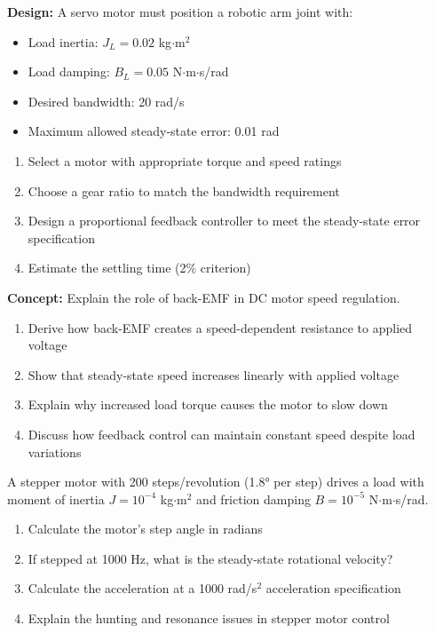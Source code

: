 \begin{exercise}
\textbf{Design:} A servo motor must position a robotic arm joint with:
\begin{itemize}
    \item Load inertia: $J_L = 0.02$ kg$\cdot$m$^2$
    \item Load damping: $B_L = 0.05$ N$\cdot$m$\cdot$s/rad
    \item Desired bandwidth: 20 rad/s
    \item Maximum allowed steady-state error: 0.01 rad
\end{itemize}

\begin{enumerate}[label=(\alph*)]
    \item Select a motor with appropriate torque and speed ratings
    \item Choose a gear ratio to match the bandwidth requirement
    \item Design a proportional feedback controller to meet the steady-state error specification
    \item Estimate the settling time (2\% criterion)
\end{enumerate}
\end{exercise}

\begin{exercise}
\textbf{Concept:} Explain the role of back-EMF in DC motor speed regulation.

\begin{enumerate}[label=(\alph*)]
    \item Derive how back-EMF creates a speed-dependent resistance to applied voltage
    \item Show that steady-state speed increases linearly with applied voltage
    \item Explain why increased load torque causes the motor to slow down
    \item Discuss how feedback control can maintain constant speed despite load variations
\end{enumerate}
\end{exercise}

\begin{exercise}
A stepper motor with 200 steps/revolution (1.8° per step) drives a load with moment of inertia $J = 10^{-4}$ kg$\cdot$m$^2$ and friction damping $B = 10^{-5}$ N$\cdot$m$\cdot$s/rad.

\begin{enumerate}[label=(\alph*)]
    \item Calculate the motor's step angle in radians
    \item If stepped at 1000 Hz, what is the steady-state rotational velocity?
    \item Calculate the acceleration at a 1000 rad/s$^2$ acceleration specification
    \item Explain the hunting and resonance issues in stepper motor control
\end{enumerate}
\end{exercise}

